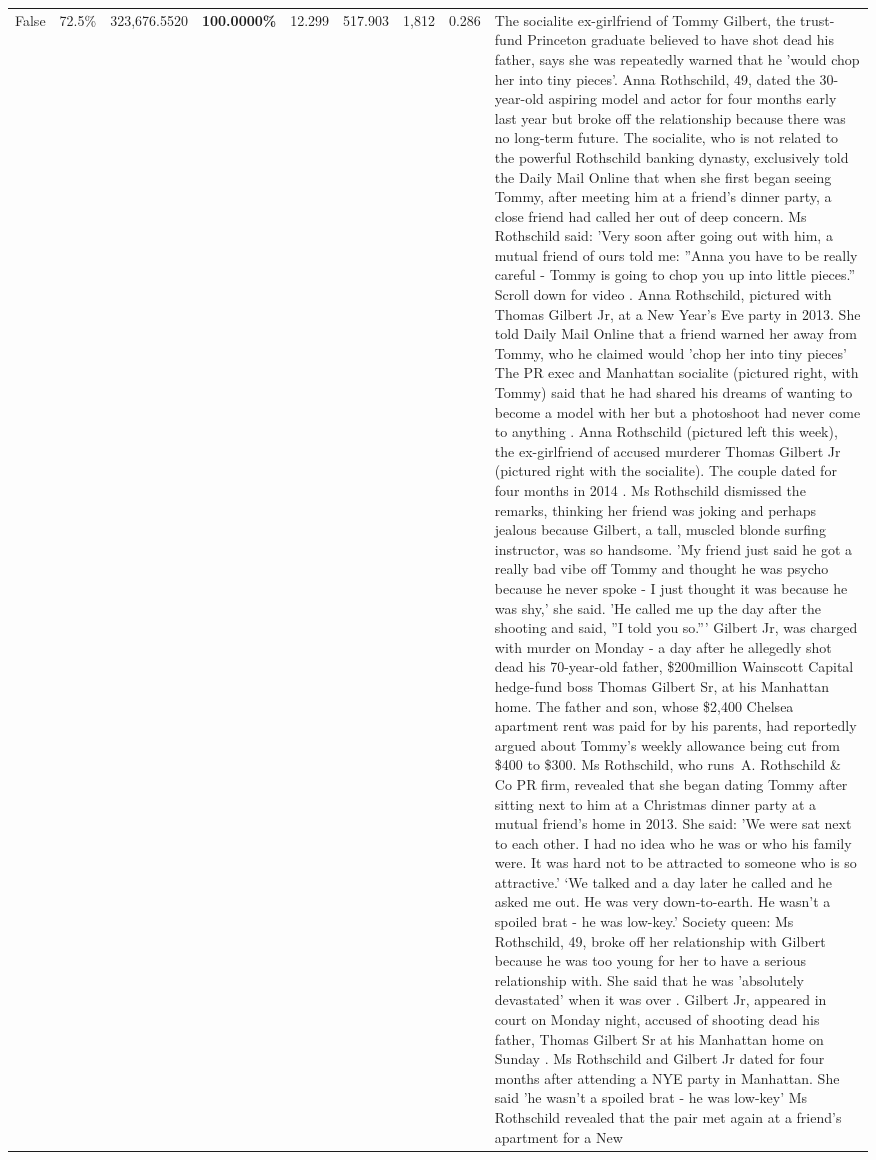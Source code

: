 \begin{table}[H]
\begin{tabular}{lllrlllll}
False & 72.5\% & 323,676.5520 & \bfseries \color{red} 100.0000\% & 12.299 & 517.903 & 1,812 & 0.286 & The socialite ex-girlfriend of Tommy Gilbert, the trust-fund Princeton graduate believed to have shot dead his father, says she was repeatedly warned that he 'would chop her into tiny pieces'. Anna Rothschild, 49, dated the 30-year-old aspiring model and actor for four months early last year but broke off the relationship because there was no long-term future. The socialite, who is not related to the powerful Rothschild banking dynasty, exclusively told the Daily Mail Online that when she first began seeing Tommy, after meeting him at a friend's dinner party, a close friend had called her out of deep concern. Ms Rothschild said: 'Very soon after going out with him, a mutual friend of ours told me: ''Anna you have to be really careful - Tommy is going to chop you up into little pieces.'' Scroll down for video . Anna Rothschild, pictured with Thomas Gilbert Jr, at a New Year's Eve party in 2013. She told Daily Mail Online that a friend warned her away from Tommy, who he claimed would 'chop her into tiny pieces' The PR exec and Manhattan socialite (pictured right, with Tommy) said that he had shared his dreams of wanting to become a model with her but a photoshoot had never come to anything . Anna Rothschild (pictured left this week), the ex-girlfriend of accused murderer Thomas Gilbert Jr (pictured right with the socialite). The couple dated for four months in 2014 . Ms Rothschild dismissed the remarks, thinking her friend was joking and perhaps jealous because Gilbert, a tall, muscled blonde surfing instructor, was so handsome. 'My friend just said he got a really bad vibe off Tommy and thought he was psycho because he never spoke - I just thought it was because he was shy,' she said. 'He called me up the day after the shooting and said, ''I told you so.''' Gilbert Jr, was charged with murder on Monday - a day after he allegedly shot dead his 70-year-old father, \$200million Wainscott Capital hedge-fund boss Thomas Gilbert Sr, at his Manhattan home. The father and son, whose \$2,400 Chelsea apartment rent was paid for by his parents, had reportedly argued about Tommy's weekly allowance being cut from \$400 to \$300. Ms Rothschild, who runs A. Rothschild \& Co PR firm, revealed that she began dating Tommy after sitting next to him at a Christmas dinner party at a mutual friend's home in 2013. She said: 'We were sat next to each other. I had no idea who he was or who his family were. It was hard not to be attracted to someone who is so attractive.' ‘We talked and a day later he called and he asked me out. He was very down-to-earth. He wasn’t a spoiled brat - he was low-key.’ Society queen: Ms Rothschild, 49, broke off her relationship with Gilbert because he was too young for her to have a serious relationship with. She said that he was 'absolutely devastated' when it was over . Gilbert Jr, appeared in court on Monday night, accused of shooting dead his father, Thomas Gilbert Sr at his Manhattan home on Sunday . Ms Rothschild and Gilbert Jr dated for four months after attending a NYE party in Manhattan. She said 'he wasn't a spoiled brat - he was low-key' Ms Rothschild revealed that the pair met again at a friend’s apartment for a New 
\end{tabular}
\end{table}
